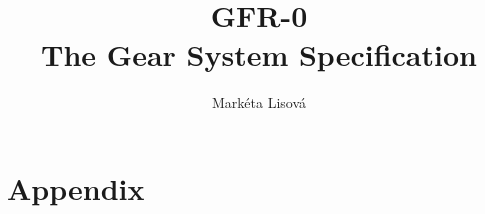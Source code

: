\documentclass[12pt,a4paper,twoside,titlepage]{book}
\begin{document}
\frontmatter
\title{GFR-0\\ \large The Gear System Specification}
\renewcommand{\docversion}{0.3}
\author{Markéta Lisová}
\maketitle
\clearemptydoublepage
\dominitoc
\tableofcontents

\mainmatter
\sloppy








\appendix
\part{Appendix}


\end{document}

